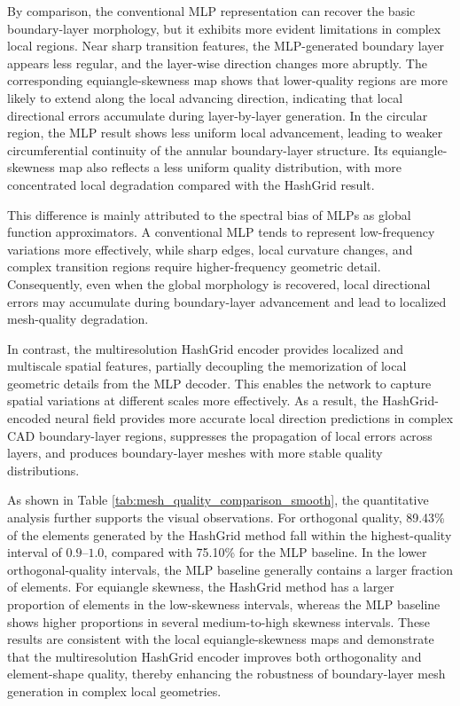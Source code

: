 \documentclass[%
 aip,
 amsmath,amssymb,
 reprint,%
nobibnotes,
]{revtex4-1}
\begin{document}
By comparison, the conventional MLP representation can recover the basic boundary-layer morphology, but it exhibits more evident limitations in complex local regions. Near sharp transition features, the MLP-generated boundary layer appears less regular, and the layer-wise direction changes more abruptly. The corresponding equiangle-skewness map shows that lower-quality regions are more likely to extend along the local advancing direction, indicating that local directional errors accumulate during layer-by-layer generation. In the circular region, the MLP result shows less uniform local advancement, leading to weaker circumferential continuity of the annular boundary-layer structure. Its equiangle-skewness map also reflects a less uniform quality distribution, with more concentrated local degradation compared with the HashGrid result.

This difference is mainly attributed to the spectral bias of MLPs as global function approximators. A conventional MLP tends to represent low-frequency variations more effectively, while sharp edges, local curvature changes, and complex transition regions require higher-frequency geometric detail. Consequently, even when the global morphology is recovered, local directional errors may accumulate during boundary-layer advancement and lead to localized mesh-quality degradation.

In contrast, the multiresolution HashGrid encoder provides localized and multiscale spatial features, partially decoupling the memorization of local geometric details from the MLP decoder. This enables the network to capture spatial variations at different scales more effectively. As a result, the HashGrid-encoded neural field provides more accurate local direction predictions in complex CAD boundary-layer regions, suppresses the propagation of local errors across layers, and produces boundary-layer meshes with more stable quality distributions.

As shown in Table \ref{tab:mesh_quality_comparison_smooth}, the quantitative analysis further supports the visual observations. For orthogonal quality, 89.43\% of the elements generated by the HashGrid method fall within the highest-quality interval of \(0.9\)--\(1.0\), compared with 75.10\% for the MLP baseline. In the lower orthogonal-quality intervals, the MLP baseline generally contains a larger fraction of elements. For equiangle skewness, the HashGrid method has a larger proportion of elements in the low-skewness intervals, whereas the MLP baseline shows higher proportions in several medium-to-high skewness intervals. These results are consistent with the local equiangle-skewness maps and demonstrate that the multiresolution HashGrid encoder improves both orthogonality and element-shape quality, thereby enhancing the robustness of boundary-layer mesh generation in complex local geometries.
\end{document}
